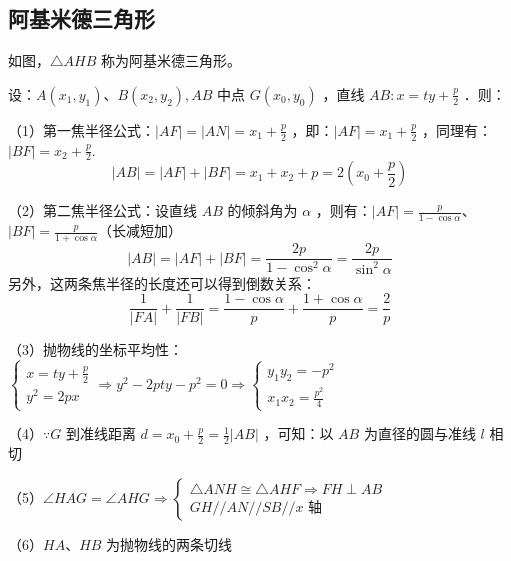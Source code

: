 \subsection{阿基米德三角形}

\begin{definition}
    如图，$\triangle A H B$ 称为阿基米德三角形。

    设：$A\left(x_1, y_1\right) 、 B\left(x_2, y_2\right), A B$ 中点 $G\left(x_0, y_0\right)$ ，直线 $A B: x=t y+\frac{p}{2}$ ．则：
\end{definition}

\begin{figure} [H]
    \centering
    \resizebox{0.3\textwidth}{!}{}
\end{figure}

\begin{theorem}

    （1）第一焦半径公式：$|A F|=|A N|=x_1+\frac{p}{2}$ ，即：$|A F|=x_1+\frac{p}{2}$ ，同理有：$|B F|=x_2+\frac{p}{2}$.
    $$|A B|=|A F|+|B F|=x_1+x_2+p=2\left(x_0+\frac{p}{2}\right)$$

    （2）第二焦半径公式：设直线 $A B$ 的倾斜角为 $\alpha$ ，则有：$|A F|=\frac{p}{1-\cos \alpha}$、$|B F|=\frac{p}{1+\cos \alpha}$（长减短加）
    $$|A B|=|A F|+|B F|=\frac{2 p}{1-\cos ^2 \alpha}=\frac{2 p}{\sin ^2 \alpha}$$
    另外，这两条焦半径的长度还可以得到倒数关系：
    $$\frac{1}{|F A|}+\frac{1}{|F B|}=\frac{1-\cos \alpha}{p}+\frac{1+\cos \alpha}{p}=\frac{2}{p}$$

    （3）抛物线的坐标平均性：$\left\{\begin{array}{l}x=t y+\frac{p}{2} \\ y^2=2 p x\end{array} \Longrightarrow y^2-2 p t y-p^2=0 \Longrightarrow\left\{\begin{array}{l}y_1 y_2=-p^2 \\ x_1 x_2=\frac{p^2}{4}\end{array}\right.\right.$

    （4）$\because G$ 到准线距离 $d=x_0+\frac{p}{2}=\frac{1}{2}|A B|$ ，可知：以 $A B$ 为直径的圆与准线 $l$ 相切

    （5）$\angle H A G=\angle A H G \Longrightarrow\left\{\begin{array}{l}\triangle A N H \cong \triangle A H F \Longrightarrow F H \perp A B \\ G H / / A N / / S B / / x \text { 轴 }\end{array}\right.$

    （6）$H A$、$H B$ 为抛物线的两条切线
\end{theorem}

